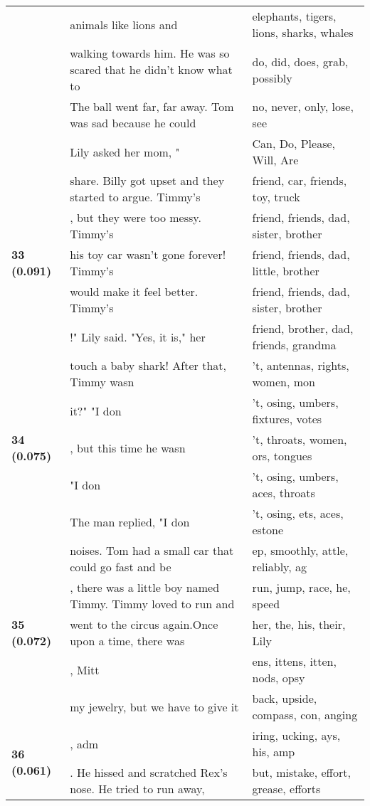 \documentclass{article}
\begin{document}
\begin{adjustbox}{max width=\textwidth}
\begin{tabular}{p{} p{} p{}}
 & animals like lions and & elephants,  tigers,  lions,  sharks,  whales \\
 & walking towards him. He was so scared that he didn't know what to & do,  did,  does,  grab,  possibly \\
 & The ball went far, far away. Tom was sad because he could & no,  never,  only,  lose,  see \\
 & Lily asked her mom, " & Can, Do, Please, Will, Are \\
\midrule
\multirow{5}{*}{\textbf{33 (0.091)}} & share. Billy got upset and they started to argue. Timmy's & friend,  car,  friends,  toy,  truck \\
 & , but they were too messy.   Timmy's & friend,  friends,  dad,  sister,  brother \\
 & his toy car wasn't gone forever!  Timmy's & friend,  friends,  dad,  little,  brother \\
 & would make it feel better.  Timmy's & friend,  friends,  dad,  sister,  brother \\
 & !" Lily said. "Yes, it is," her & friend,  brother,  dad,  friends,  grandma \\
\midrule
\multirow{5}{*}{\textbf{34 (0.075)}} & touch a baby shark! After that, Timmy wasn & 't,  antennas,  rights, women, mon \\
 & it?"  "I don & 't, osing, umbers,  fixtures,  votes \\
 & , but this time he wasn & 't,  throats, women, ors,  tongues \\
 & "I don & 't, osing, umbers, aces,  throats \\
 & The man replied, "I don & 't, osing, ets, aces, estone \\
\midrule
\multirow{5}{*}{\textbf{35 (0.072)}} & noises. Tom had a small car that could go fast and be & ep,  smoothly, attle,  reliably, ag \\
 & , there was a little boy named Timmy. Timmy loved to run and & run,  jump,  race,  he,  speed \\
 & went to the circus again.Once upon a time, there was & her,  the,  his,  their,  Lily \\
 & , Mitt & ens, ittens, itten,  nods, opsy \\
 & my jewelry, but we have to give it & back,  upside,  compass, con, anging \\
\midrule
\multirow{5}{*}{\textbf{36 (0.061)}} & , adm & iring, ucking, ays, his, amp \\
 & . He hissed and scratched Rex's nose. He tried to run away, & but,  mistake,  effort,  grease,  efforts \\

\end{tabular}
\end{adjustbox}
\end{document}
